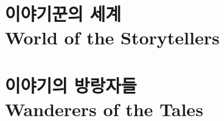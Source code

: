 \documentclass[8pt,b5paper]{book}
\begin{document}
\else
		\maketitle
		\setcounter{tocdepth}{-1}
		\tableofcontents

\fi
	
	\part{이야기꾼의 세계 \\ World of the Storytellers}
		
	
	\part{이야기의 방랑자들 \\ Wanderers of the Tales}
		
	
\end{document}
